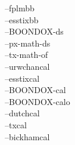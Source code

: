 \selectfont--\textrm{fplmbb}\@all@characters\\
\selectfont--\textrm{esstixbb}\@all@characters\\
\fontfamily{\BOONDOXds}\selectfont--\textrm{BOONDOX-ds}\@all@characters\\
\selectfont--\textrm{px-math-ds}\@all@characters\\%
\selectfont--\textrm{tx-math-of}\@all@characters\\
\selectfont--\textrm{urwchancal}\@all@characters\\
\selectfont--\textrm{esstixcal}\@all@characters\\
\selectfont--\textrm{BOONDOX-cal}\@all@characters\\
\selectfont--\textrm{BOONDOX-calo}\@all@characters\\
\selectfont--\textrm{dutchcal}\@all@characters\\
\selectfont--\textrm{txcal}\@all@characters\\
\selectfont--\textrm{bickhamcal}\@all@characters\\
